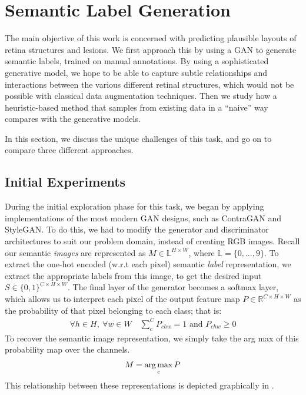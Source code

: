 \chapter{Semantic Label Generation} \label{cha:labels}

The main objective of this work is concerned with predicting plausible layouts of retina structures and lesions.
We first approach this by using a GAN to generate semantic labels, trained on manual annotations.
By using a sophisticated generative model, we hope to be able to capture subtle relationships and interactions between the various different retinal structures, which would not be possible with classical data augmentation techniques.
Then we study how a heuristic-based method that samples from existing data in a ``naive'' way compares with the generative models.

In this section, we discuss the unique challenges of this task, and go on to compare three different approaches.

\section{Initial Experiments}

During the initial exploration phase for this task, we began by applying implementations of the most modern GAN designs, such as ContraGAN and StyleGAN.
To do this, we had to modify the generator and discriminator architectures to suit our problem domain, instead of creating RGB images.
Recall our semantic \emph{images} are represented as $M \in \mathbb{L}^{H \times W}$, where $\mathbb{L} = \{0, ..., 9\}$.
To extract the one-hot encoded (w.r.t each pixel) semantic \emph{label} representation, we extract the appropriate labels from this image, to get the desired input $S \in \{ 0, 1 \}^{C \times H \times W}$.
The final layer of the generator becomes a softmax layer, which allows us to interpret each pixel of the output feature map $P \in \mathbb{R}^{C \times H\times W}$ as the probability of that pixel belonging to each class; that is:
\begin{align}
    \forall h \in H, \ \forall w \in W \quad \sum_{c}^C P_{chw} = 1 \text{ and } P_{chw} \geq 0
\end{align}
To recover the semantic image representation, we simply take the arg max of this probability map over the channels.
\begin{align}
    M = \operatorname*{arg\,max}_c P    
\end{align}
This relationship between these representations is depicted graphically in .

